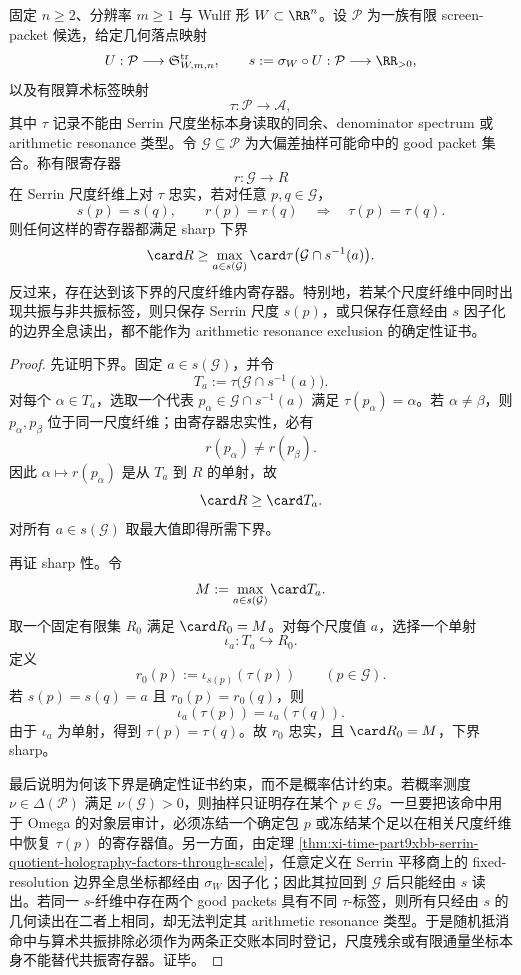 \begin{theorem}\label{distill:bourgain-random_to_deterministic_certificate_extraction-serrin-scale-fibre-resonance-register}
固定 \(n\ge2\)、分辨率 \(m\ge1\) 与 Wulff 形 \(W\subset\RR^n\)。设 \(\mathcal P\) 为一族有限 screen-packet 候选，给定几何落点映射
\[
U:\mathcal P\longrightarrow \mathfrak S_{W,m,n}^{\mathrm{tr}},
\qquad
s:=\sigma_W\circ U:\mathcal P\longrightarrow \RR_{>0},
\]
以及有限算术标签映射
\[
\tau:\mathcal P\longrightarrow \mathcal A,
\]
其中 \(\tau\) 记录不能由 Serrin 尺度坐标本身读取的同余、denominator spectrum 或 arithmetic resonance 类型。令 \(\mathcal G\subseteq\mathcal P\) 为大偏差抽样可能命中的 good packet 集合。称有限寄存器
\[
r:\mathcal G\longrightarrow R
\]
在 Serrin 尺度纤维上对 \(\tau\) 忠实，若对任意 \(p,q\in\mathcal G\)，
\[
s(p)=s(q),\qquad r(p)=r(q)
\quad\Longrightarrow\quad
\tau(p)=\tau(q).
\]
则任何这样的寄存器都满足 sharp 下界
\[
\card R\ge
\max_{a\in s(\mathcal G)}
\card\tau\bigl(\mathcal G\cap s^{-1}(a)\bigr).
\]
反过来，存在达到该下界的尺度纤维内寄存器。特别地，若某个尺度纤维中同时出现共振与非共振标签，则只保存 Serrin 尺度 \(s(p)\)，或只保存任意经由 \(s\) 因子化的边界全息读出，都不能作为 arithmetic resonance exclusion 的确定性证书。
\end{theorem}
\begin{proof}
先证明下界。固定 \(a\in s(\mathcal G)\)，并令
\[
T_a:=\tau\bigl(\mathcal G\cap s^{-1}(a)\bigr).
\]
对每个 \(\alpha\in T_a\)，选取一个代表 \(p_\alpha\in\mathcal G\cap s^{-1}(a)\) 满足 \(\tau(p_\alpha)=\alpha\)。若 \(\alpha\ne\beta\)，则 \(p_\alpha,p_\beta\) 位于同一尺度纤维；由寄存器忠实性，必有
\[
r(p_\alpha)\ne r(p_\beta).
\]
因此 \(\alpha\mapsto r(p_\alpha)\) 是从 \(T_a\) 到 \(R\) 的单射，故
\[
\card R\ge \card T_a.
\]
对所有 \(a\in s(\mathcal G)\) 取最大值即得所需下界。

再证 sharp 性。令
\[
M:=\max_{a\in s(\mathcal G)}\card T_a.
\]
取一个固定有限集 \(R_0\) 满足 \(\card R_0=M\)。对每个尺度值 \(a\)，选择一个单射
\[
\iota_a:T_a\hookrightarrow R_0.
\]
定义
\[
r_0(p):=\iota_{s(p)}(\tau(p))\qquad(p\in\mathcal G).
\]
若 \(s(p)=s(q)=a\) 且 \(r_0(p)=r_0(q)\)，则
\[
\iota_a(\tau(p))=\iota_a(\tau(q)).
\]
由于 \(\iota_a\) 为单射，得到 \(\tau(p)=\tau(q)\)。故 \(r_0\) 忠实，且 \(\card R_0=M\)，下界 sharp。

最后说明为何该下界是确定性证书约束，而不是概率估计约束。若概率测度 \(\nu\in\Delta(\mathcal P)\) 满足 \(\nu(\mathcal G)>0\)，则抽样只证明存在某个 \(p\in\mathcal G\)。一旦要把该命中用于 Omega 的对象层审计，必须冻结一个确定包 \(p\) 或冻结某个足以在相关尺度纤维中恢复 \(\tau(p)\) 的寄存器值。另一方面，由定理 \ref{thm:xi-time-part9xbb-serrin-quotient-holography-factors-through-scale}，任意定义在 Serrin 平移商上的 fixed-resolution 边界全息坐标都经由 \(\sigma_W\) 因子化；因此其拉回到 \(\mathcal G\) 后只能经由 \(s\) 读出。若同一 \(s\)-纤维中存在两个 good packets 具有不同 \(\tau\)-标签，则所有只经由 \(s\) 的几何读出在二者上相同，却无法判定其 arithmetic resonance 类型。于是随机抵消命中与算术共振排除必须作为两条正交账本同时登记，尺度残余或有限通量坐标本身不能替代共振寄存器。证毕。
\end{proof}


\endinput
